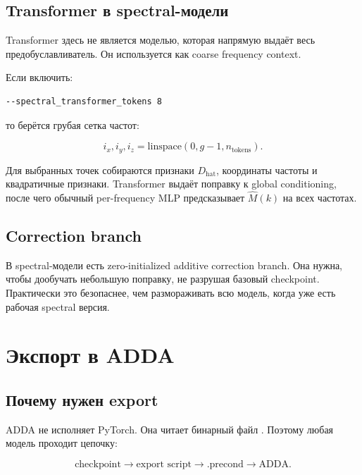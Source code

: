 \documentclass[11pt,a4paper,oneside]{book}
\newcommand{\code}[1]{\texttt{\detokenize{#1}}}
\begin{document}
\section{Transformer в spectral-модели}

Transformer здесь не является моделью, которая напрямую выдаёт весь
предобуславливатель. Он используется как coarse frequency context.

Если включить:

\begin{lstlisting}
--spectral_transformer_tokens 8
\end{lstlisting}

то берётся грубая сетка частот:

\begin{equation}
  i_x,i_y,i_z = \mathrm{linspace}(0, g-1, n_{\mathrm{tokens}}).
\end{equation}

Для выбранных точек собираются признаки $D_{\mathrm{hat}}$, координаты частоты
и квадратичные признаки. Transformer выдаёт поправку к global conditioning,
после чего обычный per-frequency MLP предсказывает $\widehat{M}(k)$ на всех
частотах.

\section{Correction branch}

В spectral-модели есть zero-initialized additive correction branch. Она нужна,
чтобы дообучать небольшую поправку, не разрушая базовый checkpoint. Практически
это безопаснее, чем размораживать всю модель, когда уже есть рабочая spectral
версия.

\chapter{Экспорт в ADDA}

\section{Почему нужен export}

ADDA не исполняет PyTorch. Она читает бинарный файл \code{.precond}. Поэтому
любая модель проходит цепочку:

\begin{equation}
  \text{checkpoint} \rightarrow \text{export script} \rightarrow \text{.precond} \rightarrow \text{ADDA}.
\end{equation}
\end{document}
